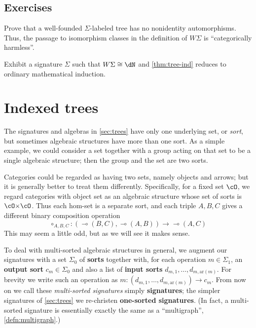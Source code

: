\documentclass{book}
\def\ay{\mathrm{ar}}
\def\sig{\Sigma}
\let\hom\multimap
\begin{document}
\subsection*{Exercises}

\begin{ex}\label{ex:wf-rigid}
  Prove that a well-founded $\sig$-labeled tree has no nonidentity automorphisms.
  Thus, the passage to isomorphism classes in the definition of $W\sig$ is ``categorically harmless''.
\end{ex}

\begin{ex}\label{ex:natw}
  Exhibit a signature $\sig$ such that $W\sig \cong \dN$ and \cref{thm:tree-ind} reduces to ordinary mathematical induction.
\end{ex}


\section{Indexed trees}
\label{sec:indexed-trees}

The signatures and algebras in \cref{sec:trees} have only one underlying set, or \emph{sort}, but sometimes algebraic structures have more than one sort.
As a simple example, we could consider a set together with a group acting on that set to be a single algebraic structure; then the group and the set are two sorts.

Categories could be regarded as having two sets, namely objects and arrows; but it is generally better to treat them differently.
Specifically, for a fixed set $\cO$, we regard categories with object set \cO as an algebraic structure whose set of sorts is $\cO\times \cO$.
Thus each hom-set is a separate sort, and each triple $A,B,C$ gives a different binary composition operation
\[ \circ_{A,B,C} : (\hom(B,C),\hom(A,B)) \to \hom(A,C) \]
This may seem a little odd, but as we will see it makes sense.

To deal with multi-sorted algebraic structures in general, we augment our signatures with a set $\sig_0$ of \textbf{sorts} together with, for each operation $m\in\sig_1$, an \textbf{output sort} $c_m\in\sig_0$ and also a list of \textbf{input sorts} $d_{m,1},\dots,d_{m,\ay(m)}$.
For brevity we write such an operation as $m:(d_{m,1},\dots,d_{m,\ay(m)}) \to c_m$.
From now on we call these \emph{multi-sorted signatures} simply \textbf{signatures}; the simpler signatures of \cref{sec:trees} we re-christen \textbf{one-sorted signatures}.
(In fact, a multi-sorted signature is essentially exactly the same as a ``multigraph'', \cref{defn:multigraph}.)
\end{document}
